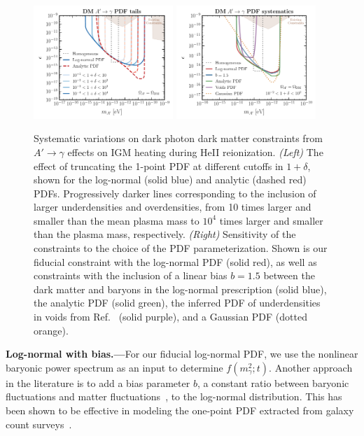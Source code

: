 \documentclass[prd,aps,10pt,nofootinbib,twocolumn,superscriptaddress,preprintnumbers,balancelastpage,longbibliography]{revtex4-1}
\begin{document}
\begin{figure}[tbp]
    \label{fig:limit_dp_systematics}
\end{figure}
%

%
\begin{figure}[tbp]
    \centering
    \includegraphics[width=0.47\textwidth]{plots/limit_dp_dm_pdf_tails}
    \includegraphics[width=0.47\textwidth]{plots/limit_dp_dm_pdfs}
    \caption{Systematic variations on dark photon dark matter constraints from $A'\to \gamma$ effects on IGM heating during HeII reionization. \emph{(Left)} The effect of truncating the 1-point PDF at different cutoffs in $1 + \delta$, shown for the log-normal (solid blue) and analytic (dashed red) PDFs. Progressively darker lines corresponding to the inclusion of larger underdensities and overdensities, from 10 times larger and smaller than the mean plasma mass to $10^4$ times larger and smaller than the plasma mass, respectively. \emph{(Right)} Sensitivity of the constraints to the choice of the PDF parameterization. Shown is our fiducial constraint with the log-normal PDF (solid red), as well as constraints with the inclusion of a linear bias $b=1.5$ between the dark matter and baryons in the log-normal prescription (solid blue), the analytic PDF (solid green), the inferred PDF of underdensities in voids from Ref.~\cite{Adermann:2018jba} (solid purple), and a Gaussian PDF (dotted orange).~} 
    \label{fig:limit_dp_dm_systematics}
\end{figure}
%

\noindent
{\bf Log-normal with bias.---}For our fiducial log-normal PDF, we use the nonlinear baryonic power spectrum as an input to determine $f(m_\gamma^2;t)$. Another approach in the literature is to add a bias parameter $b$, a constant ratio between baryonic fluctuations and matter fluctuations~\cite{Dekel:1998eq},  to the log-normal distribution. This has been shown to be effective in modeling the one-point PDF extracted from galaxy count surveys~\cite{Wild:2004me,Hurtado-Gil:2017dbm}. 
\end{document}
